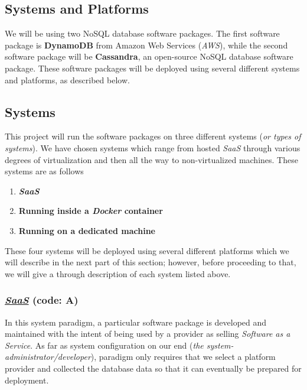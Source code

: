 \documentclass{article}[12pt]
\numberwithin{equation}{section}
\begin{document}
\begin{flushleft}
\section{Systems and Platforms}
\begin{spacing}{1.5}
	We will be using two NoSQL database software packages.  The first software package is \textbf{DynamoDB} from Amazon Web Services (\emph{AWS}), while the second software package will be \textbf{Cassandra}, an open-source NoSQL database software package.  These software packages will be deployed using several different systems and platforms, as described below.
\end{spacing}





\subsection{Systems}
\begin{spacing}{1.5}
	This project will run the software packages on three different systems (\emph{or types of systems}).  We have chosen systems which range from hosted \emph{SaaS} through various degrees of virtualization and then all the way to non-virtualized machines.  These systems are as follows
	
	\begin{enumerate}[label=\large{\textbf{\Alph*}):}]
		\item \textbf{\emph{SaaS}}
		\item \textbf{Running inside a \emph{Docker} container}
		\item \textbf{Running on a dedicated machine}
	\end{enumerate}
	
	These four systems will be deployed using several different platforms which we will describe in the next part of this section; however, before proceeding to that, we will give a through description of each system listed above.
\end{spacing}


\subsubsection{\underline{\emph{SaaS}} (code: \textbf{A}) }
\begin{spacing}{1.5}
	In this system paradigm, a particular software package is developed and maintained with the intent of being used by a provider as selling \emph{Software as a Service}. As far as system configuration on our end (\emph{the system-administrator/developer}), paradigm only requires that we select a platform provider and collected the database data so that it can eventually be prepared for deployment.
\end{spacing}



\end{flushleft}
\end{document}
